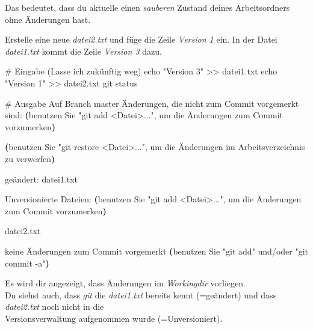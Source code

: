 \documentclass[
  letterpaper,
  DIV=11]{scrreprt}
\newenvironment{Shaded}{\begin{snugshade}}{\end{snugshade}}
\newcommand{\BuiltInTok}[1]{\textcolor[rgb]{0.00,0.23,0.31}{#1}}
\newcommand{\CommentTok}[1]{\textcolor[rgb]{0.37,0.37,0.37}{#1}}
\newcommand{\ExtensionTok}[1]{\textcolor[rgb]{0.00,0.23,0.31}{#1}}
\newcommand{\FunctionTok}[1]{\textcolor[rgb]{0.28,0.35,0.67}{#1}}
\newcommand{\KeywordTok}[1]{\textcolor[rgb]{0.00,0.23,0.31}{\textbf{#1}}}
\newcommand{\NormalTok}[1]{\textcolor[rgb]{0.00,0.23,0.31}{#1}}
\newcommand{\OperatorTok}[1]{\textcolor[rgb]{0.37,0.37,0.37}{#1}}
\newcommand{\StringTok}[1]{\textcolor[rgb]{0.13,0.47,0.30}{#1}}
\newcommand{\git}{\textit{git}\xspace}
\newcommand{\datei}[1]{\textit{#1}\xspace}
\newcommand{\work}{\textit{Workingdir}\xspace}
\begin{document}
Das bedeutet, dass du aktuelle einen \emph{sauberen} Zustand deines
Arbeitsordners ohne Änderungen hast.

Erstelle eine neue \datei{datei2.txt} und füge die Zeile \emph{Version
1} ein. In der Datei \datei{datei1.txt} kommt die Zeile \emph{Version 3}
dazu.

\begin{Shaded}
\begin{Highlighting}[]
\CommentTok{\# Eingabe (Lasse ich zukünftig weg)}
\BuiltInTok{echo} \StringTok{"Version 3"} \OperatorTok{\textgreater{}\textgreater{}}\NormalTok{ datei1.txt}
\BuiltInTok{echo} \StringTok{"Version 1"} \OperatorTok{\textgreater{}\textgreater{}}\NormalTok{ datei2.txt}
\FunctionTok{git}\NormalTok{ status }

\CommentTok{\# Ausgabe}
\ExtensionTok{Auf}\NormalTok{ Branch master}
\ExtensionTok{Änderungen,}\NormalTok{ die nicht zum Commit vorgemerkt sind:  }
  \KeywordTok{(}\ExtensionTok{benutzen}\NormalTok{ Sie }\StringTok{"git add \textless{}Datei\textgreater{}..."}\NormalTok{,  }
   \ExtensionTok{um}\NormalTok{ die Änderungen zum Commit vorzumerken}\KeywordTok{)}
  
  \KeywordTok{(}\ExtensionTok{benutzen}\NormalTok{ Sie }\StringTok{"git restore \textless{}Datei\textgreater{}..."}\NormalTok{,  }
   \ExtensionTok{um}\NormalTok{ die Änderungen im Arbeitsverzeichnis zu verwerfen}\KeywordTok{)}  

    \ExtensionTok{geändert:}\NormalTok{       datei1.txt}

\ExtensionTok{Unversionierte}\NormalTok{ Dateien:}
  \KeywordTok{(}\ExtensionTok{benutzen}\NormalTok{ Sie }\StringTok{"git add \textless{}Datei\textgreater{}..."}\NormalTok{, }
   \ExtensionTok{um}\NormalTok{ die Änderungen zum Commit vorzumerken}\KeywordTok{)}

    \ExtensionTok{datei2.txt}

\ExtensionTok{keine}\NormalTok{ Änderungen zum Commit vorgemerkt }
\KeywordTok{(}\ExtensionTok{benutzen}\NormalTok{ Sie }\StringTok{"git add"}\NormalTok{ und/oder }\StringTok{"git commit {-}a"}\KeywordTok{)}
\end{Highlighting}
\end{Shaded}

Es wird dir angezeigt, dass Änderungen im \work vorliegen.\\
Du siehst auch, dass \git die \datei{datei1.txt} bereits kennt
(=geändert) und dass \datei{datei2.txt} noch nicht in die\\
Versionsverwaltung aufgenommen wurde (=Unversioniert).
\end{document}
